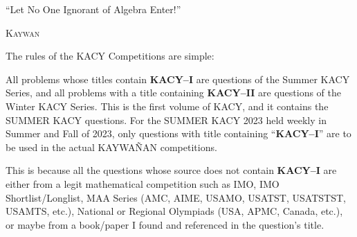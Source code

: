 \documentclass[12pt,a4paper]{memoir}
\theoremstyle{definition}
\begin{document}
	\newpage
	\normalsize
	\tableofcontents\label{TOC}
	
	\normalsize
	\pagestyle{fancy}
	\fancyhf{}

	\newpage

	\begin{tcolorbox}
		\begin{displayquote}
			``Let No One Ignorant of Algebra Enter!''
			\begin{flushright}
				\LARGE \textsc{Kaywan}
			\end{flushright}
		\end{displayquote}
	\end{tcolorbox}
	
\vspace{1em}
	
	The rules of the KACY Competitions are simple: 
	\begin{idea}
		\begin{tasks}
			\task All problems whose titles contain \textbf{KACY--I} are questions of the Summer KACY Series, and all problems with a title containing \textbf{KACY--II} are questions of the Winter KACY Series.
			\task This is the first volume of KACY, and it contains the SUMMER KACY questions. For the SUMMER KACY 2023 held weekly in Summer and Fall of 2023, only questions with title containing ``\textbf{KACY--I}'' are to be used in the actual KAYWAÑAN competitions.
		\end{tasks}
	\end{idea}
	
	\vspace{0.5em}

	This is because all the questions whose source does not contain \textbf{KACY--I} are either from a legit mathematical competition such as IMO, IMO Shortlist/Longlist, MAA Series (AMC, AIME, USAMO, USATST, USATSTST, USAMTS, etc.), National or Regional Olympiads (USA, APMC, Canada, etc.), or maybe from a book/paper I found and referenced in the question's title. 
	
	\vspace{0.5em}
	
\end{document}
